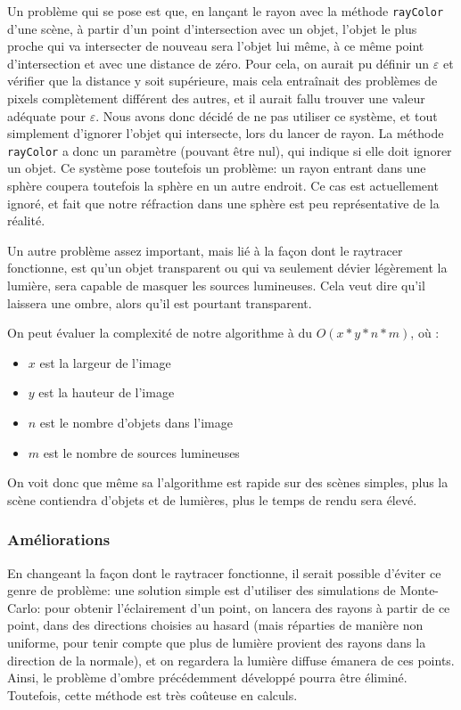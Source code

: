 \documentclass[a4paper]{article}
\begin{document}
    Un problème qui se pose est que, en lançant le rayon avec la méthode \verb+rayColor+ d'une scène,
    à partir d'un point d'intersection avec un objet, l'objet le plus proche qui va intersecter de nouveau
    sera l'objet lui même, à ce même point d'intersection et avec une distance de zéro.
    Pour cela, on aurait pu définir un $\varepsilon$ et vérifier que la distance y soit supérieure, mais
    cela entraînait des problèmes de pixels complètement différent des autres, et il aurait fallu trouver
    une valeur adéquate pour $\varepsilon$. Nous avons donc décidé de ne pas utiliser ce système, et tout
    simplement d'ignorer l'objet qui intersecte, lors du lancer de rayon.
    La méthode \verb+rayColor+ a donc un paramètre (pouvant être nul), qui indique si elle doit ignorer un objet.
    Ce système pose toutefois un problème: un rayon entrant dans une sphère coupera toutefois la sphère en un autre
    endroit. Ce cas est actuellement ignoré, et fait que notre réfraction dans une sphère est peu représentative de la réalité.

    Un autre problème assez important, mais lié à la façon dont le raytracer fonctionne, est qu'un objet transparent ou qui va seulement
    dévier légèrement la lumière, sera capable de masquer les sources lumineuses.
    Cela veut dire qu'il laissera une ombre, alors qu'il est pourtant transparent.

    On peut évaluer la complexité de notre algorithme à du $O(x*y*n*m)$, où :
    \begin{itemize}
        \item $x$ est la largeur de l'image
        \item $y$ est la hauteur de l'image
        \item $n$ est le nombre d'objets dans l'image
        \item $m$ est le nombre de sources lumineuses
    \end{itemize}
    On voit donc que même sa l'algorithme est rapide sur des scènes simples, plus la scène contiendra d'objets et de lumières, plus le temps de rendu sera élevé.

    \subsubsection{Améliorations}

    En changeant la façon dont le raytracer fonctionne, il serait possible d'éviter ce genre de problème: une solution simple est d'utiliser
    des simulations de Monte-Carlo:
    pour obtenir l'éclairement d'un point, on lancera des rayons à partir de ce point, dans des directions choisies au hasard (mais réparties de manière non
    uniforme, pour tenir compte que plus de lumière provient des rayons dans la direction de la normale), et on regardera la lumière diffuse émanera de ces points.
    Ainsi, le problème d'ombre précédemment développé pourra être éliminé.
    Toutefois, cette méthode est très coûteuse en calculs.
\end{document}

